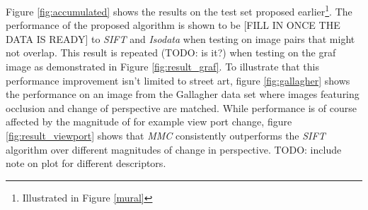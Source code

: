 \documentclass[12pt,journal,compsoc]{IEEEtran}
\begin{document}
%
%
%
Figure \ref{fig:accumulated} shows the results on the test set proposed 
earlier\footnote{Illustrated in Figure \ref{mural}}. The performance of 
the proposed algorithm is shown to be [FILL IN ONCE THE DATA IS READY] 
to \emph{SIFT} and \emph{Isodata} when testing on image pairs that might 
not overlap. This result is repeated (TODO: is it?) when testing on the 
graf image as demonstrated in Figure \ref{fig:result_graf}. To 
illustrate that this performance improvement isn't limited to street 
art, figure \ref{fig:gallagher} shows the performance on an image from 
the Gallagher data set \cite{gallagher2008} where images featuring 
occlusion and change of perspective are matched. While performance is of 
course affected by the magnitude of for example view port change, figure 
\ref{fig:result_viewport} shows that \emph{MMC} consistently outperforms 
the \emph{SIFT} algorithm over different magnitudes of change in 
perspective. TODO: include note on plot for different descriptors.
\end{document}
